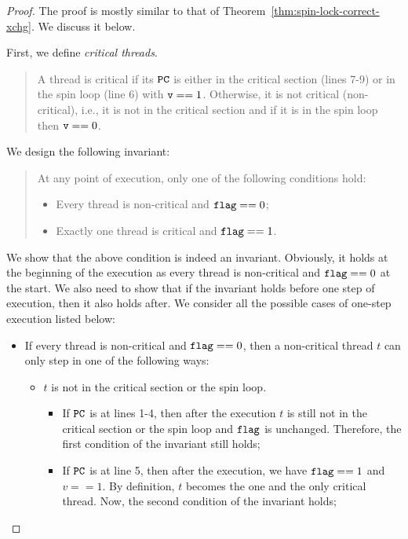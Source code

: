 \documentclass{article}[10pt]
\newcommand{\kwd}[1]{\ensuremath{\text{\ttfamily #1}}\xspace}
\def\kflag{\kwd{flag}}
\def\kv{\kwd{v}}
\begin{document}
\begin{proof}
  The proof is mostly similar to that of
  Theorem~\ref{thm:spin-lock-correct-xchg}. We discuss it below.

  First, we define \emph{critical threads}. 
  \begin{quote}
    A thread is critical if its \kwd{PC} is either in the critical
    section (lines 7-9) or in the spin loop (line 6) with $\kv ==
    1$. Otherwise, it is not critical (non-critical), i.e., it is not in the critical
    section and if it is in the spin loop then $\kv == 0$.
  \end{quote}
  We design the following invariant:
  \begin{quote}
    At any point of execution, only one of the following conditions hold:
    \begin{itemize}
    \item Every thread is non-critical and $\kflag == 0$;
    \item Exactly one thread is critical and $\kflag == 1$.
    \end{itemize}
  \end{quote}
  We show that the above condition is indeed an
  invariant. Obviously, it holds at the beginning of the execution as
  every thread is non-critical and $\kflag == 0$ at the start. We also
  need to show that if the invariant holds before one step of
  execution, then it also holds after. We consider all the possible cases
  of one-step execution listed below:
  \begin{itemize}
  \item If every thread is non-critical and $\kflag == 0$, then a
    non-critical thread $t$ can only step in one of the following ways:
    \begin{itemize}
    \item $t$ is not in the critical section or the spin loop. 

      \begin{itemize}
      \item If \kwd{PC} is at lines 1-4, then after the execution $t$
        is still not in the critical section or the spin loop and
        \kflag is unchanged. Therefore, the first condition of the
        invariant still holds;

      \item If \kwd{PC} is at line 5, then after the execution, we
        have $\kflag == 1$ and $v == 1$. By definition, $t$ becomes
        the one and the only critical thread. Now, the second
        condition of the invariant holds;


\end{itemize}
\end{itemize}
\end{itemize}
\end{proof}
\end{document}
